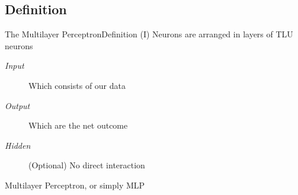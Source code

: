 \documentclass[10pt,compress]{beamer} %
\begin{document}
\subsection{Definition}

\begin{frame}{The Multilayer Perceptron}{Definition (I)}
	Neurons are arranged in \alert{layers} of TLU neurons

	\begin{description}
	\item[\textit{Input}] Which consists of our data
	\item[\textit{Output}] Which are the net outcome
	\item[\textit{Hidden}] (Optional) No direct interaction
	\end{description}
	Multilayer Perceptron, or simply \alert{MLP}
	\bigskip

        
\end{frame}


\end{document}
